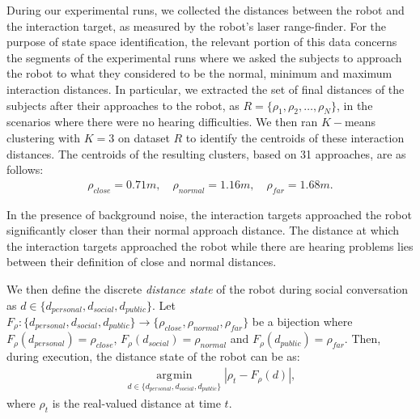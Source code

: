\documentclass[a4paper,11pt]{report}
\DeclareMathOperator*{\argmin}{\arg\!\min}
\begin{document}
During our experimental runs, we collected the distances between the robot and the interaction target, as measured by the robot's laser range-finder. For the purpose of state space identification, the relevant portion of this data concerns the segments of the experimental runs where we asked the subjects to approach the robot to what they considered to be the normal, minimum and maximum interaction distances. In particular, we extracted the set of final distances of the subjects after their approaches to the robot, as $R = \{\rho_1, \rho_2,\ldots,\rho_N\}$, in the scenarios where there were no hearing difficulties. We then ran $K-$means clustering \cite{hartigan1979algorithm} with $K=3$ on dataset $R$ to identify the centroids of these interaction distances. The centroids of the resulting clusters, based on 31 approaches, are as follows:
\begin{align*}
\rho_{close} = 0.71m,\quad \rho_{normal} = 1.16m,\quad \rho_{far} = 1.68m.
\end{align*}


In the presence of background noise, the interaction targets approached the robot significantly closer than their normal approach distance.
The distance at which the interaction targets approached the robot while there are hearing problems lies between their definition of close and normal distances. 


We then define the discrete \emph{distance state} of the robot during social conversation as $d\in\{d_{personal},d_{social},d_{public}\}$.
 Let $F_{\rho}:\{d_{personal},d_{social},d_{public}\}\rightarrow\{\rho_{close}, \rho_{normal}, \rho_{far}\}$ be a bijection where $F_\rho(d_{personal}) = \rho_{close}$,  $F_\rho(d_{social}) = \rho_{normal}$ and  $F_\rho(d_{public}) = \rho_{far}$. Then, during execution, the distance state of the robot can be as:
 \begin{align*}
   \argmin\limits_{d\in\{d_{personal},d_{social},d_{public}\}} |\rho_t-F_\rho(d)|,
 \end{align*}
where $\rho_t$ is the real-valued distance at time $t$.
\end{document}
